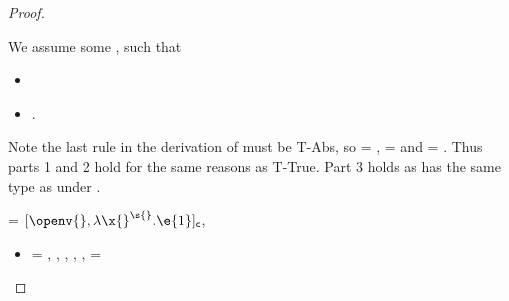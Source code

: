 \begin{lemma}
\begin{proof}
\begin{case}[B-Abs]
\begin{itemize}
\begin{subcase}[T-Clos]
        We assume some \propenvp{}, such that
        \begin{itemize}
          \item \satisfies{\openv{}}{\propenvp{}}
          \item \judgement {\propenvp{}} {\abs {\x{}} {\s{}} {}} {\ty{}}
                           {\filterset {\thenprop {\prop{}}}
                                       {\elseprop {\prop{}}}}
                           {\object{}}.
       \end{itemize}
       Note the last rule in the derivation of
          \judgement {\propenvp{}} {\abs {\x{}} {\s{}} {}} {\ty{}}
                           {\filterset {\thenprop {\prop{}}}
                                       {\elseprop {\prop{}}}}
                           {\object{}}
                           must be T-Abs, so 
                           {\thenprop {\prop{}}} = {\topprop{}},
                           {\elseprop {\prop{}}} = {\botprop{}}
                           and {\object{}} = {\emptyobject{}}.
         Thus parts 1 and 2 hold for the same reasons as T-True.
         Part 3 holds as \val{} has the same type as {\abs {\x{}} {\s{}} {}}
         under \propenvp{}.

      \end{subcase} 
  \end{itemize}
\end{case}

\begin{case}[B-Abs]
        \val{} = ${\closure {\openv{}} {\abs {\x{}} {\s{}} {\e{1}}}}$,
          { \opsem {\openv{}}
                   {\abs {\x{}} {\ty{}} {}}
                   {\closure {\openv{}} {\abs {\x{}} {\s{}} {}}}}

  \begin{itemize}
    \item[]
      \begin{subcase}[T-Abs]
  \ep{} = {\abs {\x{}} {\s{}} {}},
{ \judgementrewrite {\propenv{}, {\isprop {\s{}} {\x{}}}}
            {} {\ty{}}
             {
                         {}}
             {}
             {}},
           \issubtypein{}
           {\ArrowOne {\x{}} {\s{}}
                      {}
                      {
                                  {}}
                      {}}
          {\ty{}},
          \inpropenv{\topprop{}}{\thenprop{\prop{}}},
          \inpropenv{\botprop{}}{\elseprop{\prop{}}},
          {\object{}} = {\emptyobject{}}


\end{subcase}
\end{itemize}
\end{case}
\end{proof}
\end{lemma}
